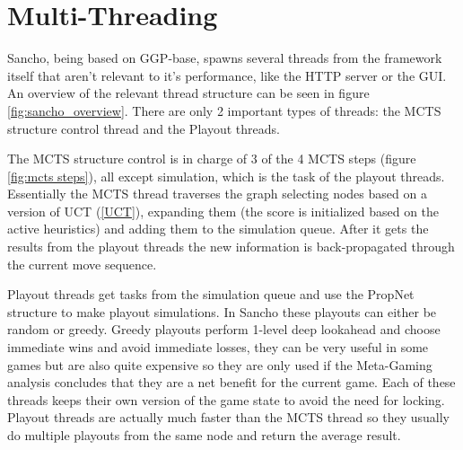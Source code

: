 \section{Multi-Threading}
Sancho, being based on GGP-base, spawns several threads from the framework itself that aren't relevant to it's performance, like the HTTP server or the GUI.
An overview of the relevant thread structure can be seen in figure \ref{fig:sancho_overview}. There are only 2 important types of threads: the MCTS structure control thread and the Playout threads.

The MCTS structure control is in charge of 3 of the 4 MCTS steps (figure \ref{fig:mcts steps}), all except simulation, which is the task of the playout threads.
Essentially the MCTS thread traverses the graph selecting nodes based on a version of UCT (\ref{UCT}), expanding them (the score is initialized based on the active heuristics) and adding them to the simulation queue. After it gets the results from the playout threads the new information is back-propagated through the current move sequence.

Playout threads get tasks from the simulation queue and use the PropNet structure to make playout simulations. In Sancho these playouts can either be random or greedy. Greedy playouts perform 1-level deep lookahead and choose immediate wins and avoid immediate losses, they can be very useful in some games but are also quite expensive so they are only used if the Meta-Gaming analysis concludes that they are a net benefit for the current game. Each of these threads keeps their own version of the game state to avoid the need for locking. Playout threads are actually much faster than the MCTS thread so they usually do multiple playouts from the same node and return the average result.


